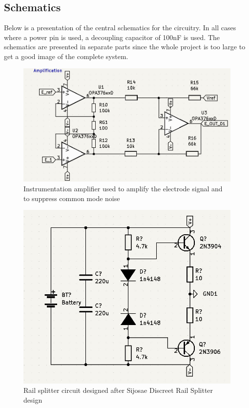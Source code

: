 \subsection{Schematics}
Below is a presentation of the central schematics for the circuitry. In all cases where a power pin is used, a decoupling capacitor of 100nF is used. The schematics are presented in separate parts since the whole project is too large to get a good image of the complete system.
\begin{figure} [H]
\begin{center}
\includegraphics[scale=0.5]{images/Amplifiern.jpg}
   \caption{Instrumentation amplifier used to amplify the electrode signal and to suppress common mode noise}
    \label{fig:amplifier}
\end{center}
\end{figure}

\begin{figure} [H]
\begin{center}
\includegraphics[scale=0.5]{images/Railsplitter.jpg}
   \caption{Rail splitter circuit designed after Sijosae Discreet Rail Splitter design \cite{railsplit}}
    \label{fig:railsplit}
\end{center}
\end{figure}

